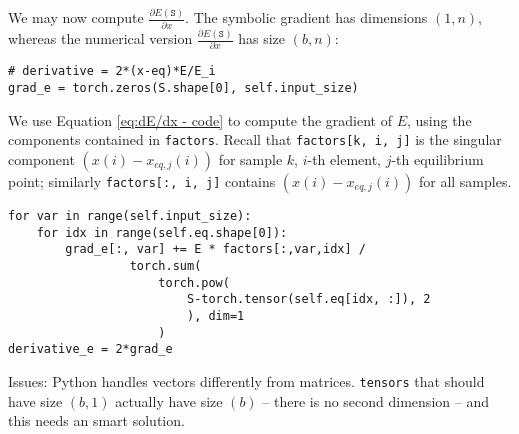 \documentclass[]{article}
\begin{document}
\bigskip

We may now compute $\frac{\partial E(\texttt{S})}{\partial x}$. The symbolic gradient has dimensions $(1, n)$, whereas the numerical version $\frac{\partial E(\texttt{S})}{\partial x}$ has size $(b, n)$:
\begin{verbatim}
# derivative = 2*(x-eq)*E/E_i
grad_e = torch.zeros(S.shape[0], self.input_size)
\end{verbatim}

We use Equation \eqref{eq:dE/dx - code} to compute the gradient of $E$, using the components contained in \verb#factors#.  
Recall that \verb#factors[k, i, j]# is the singular component $(x(i) - x_{eq, j}(i))$ for sample $k$, $i$-th element, $j$-th equilibrium point; similarly \verb#factors[:, i, j]# contains $(x(i) - x_{eq, j}(i))$ for all samples.


\begin{verbatim}
for var in range(self.input_size):
    for idx in range(self.eq.shape[0]):
        grad_e[:, var] += E * factors[:,var,idx] / 
                 torch.sum(
                     torch.pow(
                         S-torch.tensor(self.eq[idx, :]), 2
                         ), dim=1
                     )
derivative_e = 2*grad_e
\end{verbatim}


Issues: 
Python handles vectors differently from matrices. \verb#tensors# that should have size $(b, 1)$ actually have size $(b)$ -- there is no second dimension -- and this needs an smart solution. 
\end{document}
